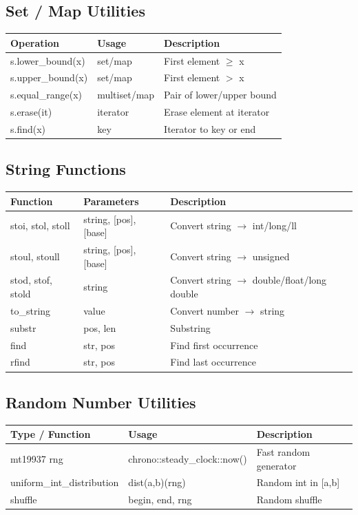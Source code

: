 \documentclass[10pt]{article}
\begin{document}
\begin{multicols*}{2}
\subsection*{Set / Map Utilities}
\begin{tabularx}{\linewidth}{|l|l|X|}
    \hline
    \textbf{Operation} & \textbf{Usage} & \textbf{Description} \\
    \hline
    s.lower\_bound(x) & set/map & First element $\geq$ x \\
    \hline
    s.upper\_bound(x) & set/map & First element $>$ x \\
    \hline
    s.equal\_range(x) & multiset/map & Pair of lower/upper bound \\
    \hline
    s.erase(it) & iterator & Erase element at iterator \\
    \hline
    s.find(x) & key & Iterator to key or end \\
    \hline
\end{tabularx}

\subsection*{String Functions}
\begin{tabularx}{\linewidth}{|l|l|X|}
    \hline
    \textbf{Function} & \textbf{Parameters} & \textbf{Description} \\
    \hline
    stoi, stol, stoll & string, [pos], [base] & Convert string $\to$ int/long/ll \\
    \hline
    stoul, stoull & string, [pos], [base] & Convert string $\to$ unsigned \\
    \hline
    stod, stof, stold & string & Convert string $\to$ double/float/long double \\
    \hline
    to\_string & value & Convert number $\to$ string \\
    \hline
    substr & pos, len & Substring \\
    \hline
    find & str, pos & Find first occurrence \\
    \hline
    rfind & str, pos & Find last occurrence \\
    \hline
\end{tabularx}

\subsection*{Random Number Utilities}
\begin{tabularx}{\linewidth}{|l|l|X|}
    \hline
    \textbf{Type / Function} & \textbf{Usage} & \textbf{Description} \\
    \hline
    mt19937 rng & chrono::steady\_clock::now() & Fast random generator \\
    \hline
    uniform\_int\_distribution & dist(a,b)(rng) & Random int in [a,b] \\
    \hline
    shuffle & begin, end, rng & Random shuffle \\
    \hline
\end{tabularx}


\end{multicols*}
\end{document}
